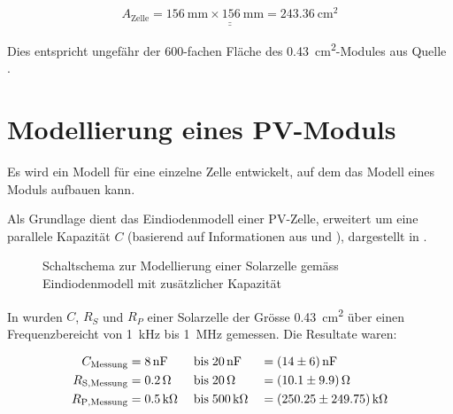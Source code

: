 \begin{equation}
    \label{eq:cell:surface}
    \underline{\underline{A_{\mathrm{Zelle}} = \SI{156}{\milli\meter} \times \SI{156}{\milli\meter} = \SI{243.36}{\centi\meter\squared}}}
\end{equation}

Dies     entspricht     ungef\"ahr     der     600-fachen     Fl\"ache     des
\SI{0.43}{\centi\meter\squared}-Modules aus  Quelle \cite{ref:solar:scofield}.


\section{Modellierung eines PV-Moduls}
\label{app:models:develop:module}

Es wird  ein Modell f\"ur eine  einzelne Zelle entwickelt, auf  dem das Modell
eines  Moduls  aufbauen  kann.

Als   Grundlage   dient   das  Eindiodenmodell   einer   PV-Zelle,   erweitert
um   eine  parallele   Kapazit\"at  $C$   (basierend  auf   Informationen  aus
\cite{ref:solar:scofield}   und   \cite{ref:solar:friesen}),  dargestellt   in
.

\begin{figure}[h!tb]
    \centering
    
    \caption{%
        Schaltschema    zur    Modellierung    einer    Solarzelle    gem\"ass
        Eindiodenmodell mit zus\"atzlicher Kapazit\"at%
    }
    \label{fig:circuit:solarCell}
\end{figure}

In \cite{ref:solar:scofield} wurden $C$,  $R_{S}$ und $R_{P}$ einer Solarzelle
der Gr\"osse \SI{0.43}{\centi\meter\squared} \"uber einen Frequenzbereicht von
\SI{1}{\kilo\hertz} bis \SI{1}{\mega\hertz} gemessen. Die Resultate waren:

\begin{alignat}{3}
    \label{eq:scofield:C}
    C_{\mathrm{Messung}}    &= \SI{8}{\nano\farad} \; & \text{bis} \; & \SI{20}{\nano\farad} \;  & = & \; \SI{14 \pm 6}{\nano\farad} \\
    \label{eq:scofield:Rs}
    R_{\mathrm{S, Messung}} &= \SI{0.2}{\ohm}      \; & \text{bis} \; & \SI{20}{\ohm}        \;  & = & \; \SI{10.1 \pm 9.9}{\ohm}     \\
    \label{eq:scofield:Rp}
    R_{\mathrm{P, Messung}} &= \SI{0.5}{\kilo\ohm} \; & \text{bis} \; & \SI{500}{\kilo\ohm}  \;  & = & \; \SI{250.25 \pm 249.75}{\kilo\ohm}
\end{alignat}


